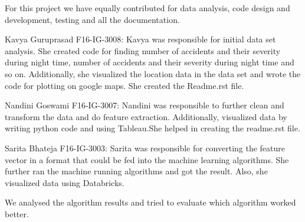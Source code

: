 \documentclass{acm_proc_article-sp}
\begin{document}
For this project we have equally contributed for data analysis, code design and development, testing and all the documentation.

Kavya Guruprasad
F16-IG-3008:
Kavya was responsible for initial data set analysis. She created code for finding number of accidents and their severity during night time, number of accidents and their severity during night time and so on. Additionally, she visualized the location data in the data set and wrote the code for plotting on google maps. She created the Readme.rst file.

Nandini Goswami
F16-IG-3007:
Nandini was responsible to further clean and transform the data and do feature extraction.  Additionally, visualized data by writing python code and using Tableau.She helped in creating the readme.rst file. 

Sarita Bhateja
F16-IG-3003:
Sarita was responsible for converting the feature vector in a format that could be fed into the machine learning algorithms. She further ran the machine running algorithms and got the result. Also, she visualized data using Databricks.

We analysed the algorithm results and tried to evaluate which algorithm worked better.




\end{document}
